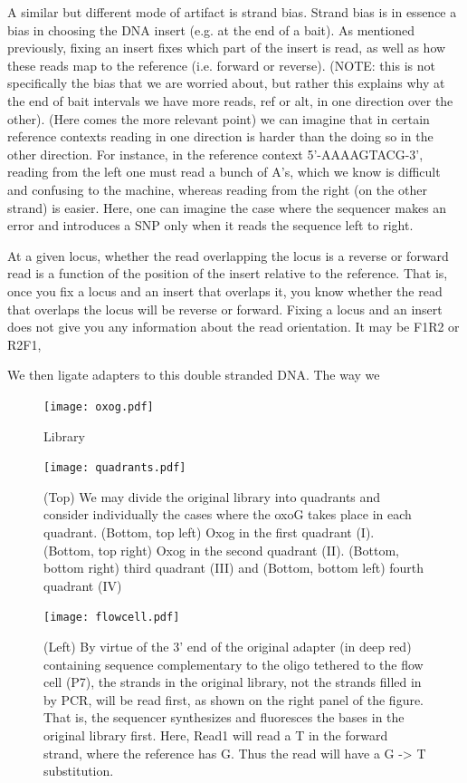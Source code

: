 \documentclass[a4paper]{article}
\begin{document}
A similar but different mode of artifact is strand bias. Strand bias is in essence a bias in choosing the DNA insert (e.g. at the end of a bait). As mentioned previously, fixing an insert fixes which part of the insert is read, as well as how these reads map to the reference (i.e. forward or reverse). (NOTE: this is not specifically the bias that we are worried about, but rather this explains why at the end of bait intervals we have more reads, ref or alt, in one direction over the other). (Here comes the more relevant point) we can imagine that in certain reference contexts reading in one direction is harder than the doing so in the other direction. For instance, in the reference context 5'-AAAAGTACG-3', reading from the left one must read a bunch of A's, which we know is difficult and confusing to the machine, whereas reading from the right (on the other strand) is easier. Here, one can imagine the case where the sequencer makes an error and introduces a SNP only when it reads the sequence left to right. 

At a given locus, whether the read overlapping the locus is a reverse or forward read is a function of the position of the insert relative to the reference. That is, once you fix a locus and an insert that overlaps it, you know whether the read that overlaps the locus will be reverse or forward. Fixing a locus and an insert does not give you any information about the read orientation. It may be F1R2 or R2F1, 

We then ligate adapters to this double stranded DNA. The way we 


\begin{figure}
  \texttt{[image: oxog.pdf]}
  \caption{Library }
  \label{fig:oxog}
\end{figure}


\begin{figure}
  \texttt{[image: quadrants.pdf]}
  \caption{(Top) We may divide the original library into quadrants and consider individually the cases where the oxoG takes place in each quadrant. (Bottom, top left) Oxog in the first quadrant (I). (Bottom, top right) Oxog in the second quadrant (II). (Bottom, bottom right) third quadrant (III) and (Bottom, bottom left) fourth quadrant (IV) }
  \label{fig:quadrants}
\end{figure}

\begin{figure}
  \texttt{[image: flowcell.pdf]}
  \caption{(Left) By virtue of the 3' end of the original adapter (in deep red) containing sequence complementary to the oligo tethered to the flow cell (P7), the strands in the original library, not the strands filled in by PCR, will be read first, as shown on the right panel of the figure. That is, the sequencer synthesizes and fluoresces the bases in the original library first. Here, Read1 will read a T in the forward strand, where the reference has G. Thus the read will have a G -> T substitution. }
  \label{fig:flowcell}
\end{figure}
\end{document}
